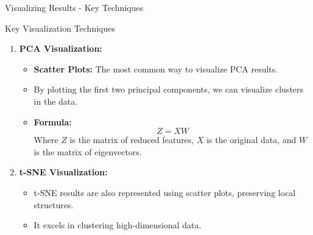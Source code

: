 \documentclass[aspectratio=169]{beamer}
\begin{document}
\begin{frame}[fragile]{Visualizing Results - Key Techniques}
    \begin{block}{Key Visualization Techniques}
        \begin{enumerate}
            \item \textbf{PCA Visualization:}
            \begin{itemize}
                \item \textbf{Scatter Plots:} The most common way to visualize PCA results.
                \item By plotting the first two principal components, we can visualize clusters in the data.
                \item \textbf{Formula:}
                \begin{equation}
                    Z = XW
                \end{equation}
                Where $Z$ is the matrix of reduced features, $X$ is the original data, and $W$ is the matrix of eigenvectors.
            \end{itemize}

            \item \textbf{t-SNE Visualization:}
            \begin{itemize}
                \item t-SNE results are also represented using scatter plots, preserving local structures.
                \item It excels in clustering high-dimensional data.
            \end{itemize}
        \end{enumerate}
    \end{block}
\end{frame}
\end{document}
